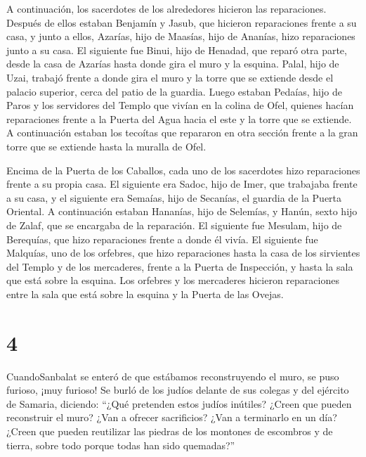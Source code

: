  A continuación, los sacerdotes de los alrededores hicieron
las reparaciones.  Después de ellos estaban Benjamín y
Jasub, que hicieron reparaciones frente a su casa, y junto a ellos,
Azarías, hijo de Maasías, hijo de Ananías, hizo reparaciones junto a su
casa.  El siguiente fue Binui, hijo de Henadad, que reparó
otra parte, desde la casa de Azarías hasta donde gira el muro y la
esquina.  Palal, hijo de Uzai, trabajó frente a donde gira
el muro y la torre que se extiende desde el palacio superior, cerca del
patio de la guardia. Luego estaban Pedaías, hijo de Paros 
y los servidores del Templo que vivían en la colina de Ofel, quienes
hacían reparaciones frente a la Puerta del Agua hacia el este y la torre
que se extiende.  A continuación estaban los tecoítas que
repararon en otra sección frente a la gran torre que se extiende hasta
la muralla de Ofel.

 Encima de la Puerta de los Caballos, cada uno de los
sacerdotes hizo reparaciones frente a su propia casa.  El
siguiente era Sadoc, hijo de Imer, que trabajaba frente a su casa, y el
siguiente era Semaías, hijo de Secanías, el guardia de la Puerta
Oriental.  A continuación estaban Hananías, hijo de
Selemías, y Hanún, sexto hijo de Zalaf, que se encargaba de la
reparación. El siguiente fue Mesulam, hijo de Berequías, que hizo
reparaciones frente a donde él vivía.  El siguiente fue
Malquías, uno de los orfebres, que hizo reparaciones hasta la casa de
los sirvientes del Templo y de los mercaderes, frente a la Puerta de
Inspección, y hasta la sala que está sobre la esquina.  Los
orfebres y los mercaderes hicieron reparaciones entre la sala que está
sobre la esquina y la Puerta de las Ovejas.

\hypertarget{section-3}{%
\section{4}\label{section-3}}

 CuandoSanbalat se enteró de que estábamos reconstruyendo el
muro, se puso furioso, ¡muy furioso! Se burló de los judíos 
delante de sus colegas y del ejército de Samaria, diciendo: ``¿Qué
pretenden estos judíos inútiles? ¿Creen que pueden reconstruir el muro?
¿Van a ofrecer sacrificios? ¿Van a terminarlo en un día? ¿Creen que
pueden reutilizar las piedras de los montones de escombros y de tierra,
sobre todo porque todas han sido quemadas?''

